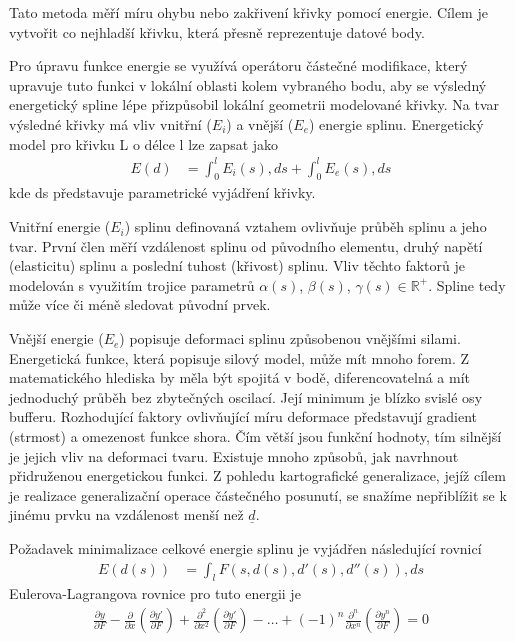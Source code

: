 \documentclass[a4paper,12pt]{article}
\begin{document}
    Tato metoda měří míru ohybu nebo zakřivení křivky pomocí energie. Cílem je vytvořit co nejhladší křivku, která přesně reprezentuje datové body.

    Pro úpravu funkce energie se využívá operátoru částečné modifikace, který upravuje tuto funkci v lokální oblasti kolem vybraného bodu, aby se výsledný energetický spline lépe přizpůsobil lokální geometrii modelované křivky. Na tvar výsledné křivky má vliv vnitřní ($E_i$) a vnější ($E_e$) energie splinu. Energetický model pro křivku L o délce l lze zapsat jako
    \begin{align*}
    E(d) &= \int_0^l E_i(s) , ds + \int_0^l E_e(s) , ds
    \end{align*}
    kde ds představuje parametrické vyjádření křivky.

    Vnitřní energie ($E_i$) splinu definovaná vztahem ovlivňuje průběh splinu a jeho tvar. První člen měří vzdálenost splinu od původního elementu, druhý napětí (elasticitu) splinu a poslední tuhost (křivost) splinu. Vliv těchto faktorů je modelován s využitím trojice parametrů $\alpha(s)$, $\beta(s)$, $\gamma(s) \in \mathbb{R}^+$. Spline tedy může více či méně sledovat původní prvek.

    Vnější energie ($E_e$) popisuje deformaci splinu způsobenou vnějšími silami. Energetická funkce, která popisuje silový model, může mít mnoho forem. Z matematického hlediska by měla být spojitá v bodě, diferencovatelná a mít jednoduchý průběh bez zbytečných oscilací. Její minimum je blízko svislé osy bufferu. Rozhodující faktory ovlivňující míru deformace představují gradient (strmost) a omezenost funkce shora. Čím větší jsou funkční hodnoty, tím silnější je jejich vliv na deformaci tvaru. Existuje mnoho způsobů, jak navrhnout přidruženou energetickou funkci. Z pohledu kartografické generalizace, jejíž cílem je realizace generalizační operace částečného posunutí, se snažíme nepřiblížit se k jinému prvku na vzdálenost menší než $\underline{d}$.

    Požadavek minimalizace celkové energie splinu je vyjádřen následující rovnicí
    \begin{align*}
    E(d(s)) &= \int_l F(s, d(s), d'(s), d''(s)) , ds
    \end{align*}
    Eulerova-Lagrangova rovnice pro tuto energii je
    \begin{align*}
    \frac{\partial y}{\partial F} - \frac{\partial}{\partial x} \left(\frac{\partial y'}{\partial F}\right) + \frac{\partial^2}{\partial x^2} \left(\frac{\partial y'}{\partial F}\right) - \ldots + (-1)^n \frac{\partial^n}{\partial x^n} \left(\frac{\partial y^n}{\partial F}\right) = 0
    \end{align*}
    
\end{document}
